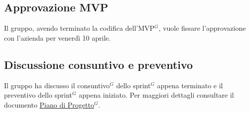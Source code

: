 \subsection{Approvazione MVP}
Il gruppo, avendo terminato la codifica dell'MVP$^G$, vuole fissare l'approvazione con l'azienda per venerdì 10 aprile.

\subsection{Discussione consuntivo e preventivo}
Il gruppo ha discusso il consuntivo$^G$ dello sprint$^G$ appena terminato e il preventivo dello sprint$^G$ appena iniziato. Per maggiori dettagli consultare il documento \href{https://nullpointersgroup.github.io/Documentazione/output/PB/Documenti%20Esterni/Piano_di_Progetto.pdf}{Piano di Progetto$^G$}.